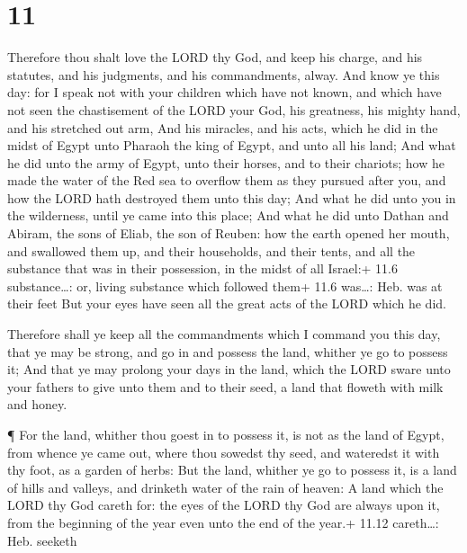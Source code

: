 \hypertarget{section-10}{%
\section{11}\label{section-10}}

 Therefore thou shalt love the LORD thy God, and keep his
charge, and his statutes, and his judgments, and his commandments,
alway.  And know ye this day: for I speak not with your
children which have not known, and which have not seen the chastisement
of the LORD your God, his greatness, his mighty hand, and his stretched
out arm,  And his miracles, and his acts, which he did in
the midst of Egypt unto Pharaoh the king of Egypt, and unto all his
land;  And what he did unto the army of Egypt, unto their
horses, and to their chariots; how he made the water of the Red sea to
overflow them as they pursued after you, and how the LORD hath destroyed
them unto this day;  And what he did unto you in the
wilderness, until ye came into this place;  And what he did
unto Dathan and Abiram, the sons of Eliab, the son of Reuben: how the
earth opened her mouth, and swallowed them up, and their households, and
their tents, and all the substance that was in their possession, in the
midst of all Israel:+ 11.6 substance\ldots: or, living substance which
followed them+ 11.6 was\ldots: Heb. was at their feet  But
your eyes have seen all the great acts of the LORD which he did.

 Therefore shall ye keep all the commandments which I
command you this day, that ye may be strong, and go in and possess the
land, whither ye go to possess it;  And that ye may prolong
your days in the land, which the LORD sware unto your fathers to give
unto them and to their seed, a land that floweth with milk and honey.

 ¶ For the land, whither thou goest in to possess it, is
not as the land of Egypt, from whence ye came out, where thou sowedst
thy seed, and wateredst it with thy foot, as a garden of herbs:
 But the land, whither ye go to possess it, is a land of
hills and valleys, and drinketh water of the rain of heaven:
 A land which the LORD thy God careth for: the eyes of the
LORD thy God are always upon it, from the beginning of the year even
unto the end of the year.+ 11.12 careth\ldots: Heb. seeketh

